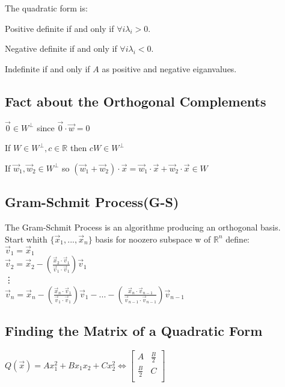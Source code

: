 \documentclass[5pt]{article}
\begin{document}
\begin{multicols}{2}
\begin{theorem}
  The quadratic form is:
  \begin{itemize*}
    \item Positive definite if and only if $\forall i\lambda_i>0$.
    \item Negative definite if and only if $\forall i\lambda_i<0$.
    \item Indefinite if and only if $A$ as positive and negative eiganvalues.
  \end{itemize*}
\end{theorem}

\subsection{Fact about the Orthogonal Complements}
\begin{itemize*}
  \item $\vec{0}\in W^\perp$ since $\vec{0}\cdot\vec{w}=0$
  \item If $W\in W^\perp, c\in \mathbb{R}$ then $cW\in W^\perp$
  \item If $\vec{w}_1,\vec{w}_2\in W^\perp$ so $(\vec{w}_1+\vec{w}_2)\cdot\vec{x}=\vec{w}_1\cdot\vec{x}+\vec{w}_2\cdot\vec{x}\in W$
\end{itemize*}

\subsection{Gram-Schmit Process(G-S)}
The Gram-Schmit Process is an algorithme producing an orthogonal basis.\\
Start whith $\{\vec{x}_1,...,\vec{x}_n\}$ basis for noozero subspace w of $\mathbb{R}^n$ define:\\
$\vec{v}_1=\vec{x}_1$\\
$\vec{v}_2=\vec{x}_2 -\left(\frac{\vec{x}_2\cdot\vec{v}_1}{\vec{v}_1\cdot\vec{v}_1}\right)\vec{v}_1$\\
\vdots\\
$\vec{v}_n=\vec{x}_n -\left(\frac{\vec{x}_n\cdot\vec{v}_1}{\vec{v}_1\cdot\vec{v}_1}\right)\vec{v}_1- ... -\left(\frac{\vec{x}_n\cdot\vec{v}_{n-1}}{\vec{v}_{n-1}\cdot\vec{v}_{n-1}}\right)\vec{v}_{n-1}$\\


\subsection{Finding the Matrix of a Quadratic Form}
$Q(\vec{x})=Ax^2_1+Bx_1x_2+Cx^2_2 \Leftrightarrow
\begin{bmatrix}
  A & \frac{B}{2} \\
  \frac{B}{2} & C \\
\end{bmatrix}
$


\end{multicols}
\end{document}
